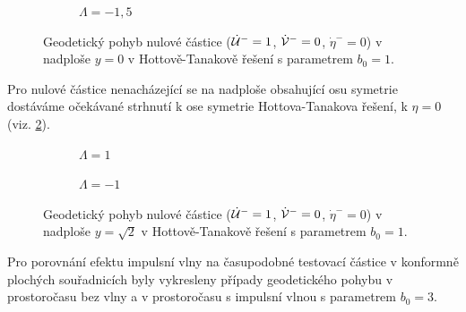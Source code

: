 \begin{figure}[ht]
\begin{subfigure}[b]{0.45\textwidth}
\begin{tikzpicture}
        \end{tikzpicture}
        \caption{$\Lambda = -1,5$}
    \end{subfigure}
    \caption{Geodetický pohyb nulové částice ($\dot \matu^-=1$, $\dot \matv^-=0$, $\dot \eta^-=0$) v nadploše $y = 0$ v Hottově-Tanakově řešení s parametrem $b_0 = 1$.}
    \label{fig:HottaTanakaNullY0}
\end{figure}

Pro nulové částice nenacházející se na nadploše obsahující osu symetrie dostáváme očekávané strhnutí k
ose symetrie Hottova-Tanakova řešení, k $\eta=0$ (viz. \ref{fig:HottaTanakaNullYsqrt2}). 

\begin{figure}[ht]
    \centering
    \begin{subfigure}[b]{0.45\textwidth}
        \caption{$\Lambda = 1$}
    \end{subfigure}
    \hfill
    \begin{subfigure}[b]{0.45\textwidth}
        \caption{$\Lambda = -1$}
    \end{subfigure}
    \caption{Geodetický pohyb nulové částice ($\dot \matu^-=1$, $\dot \matv^-=0$, $\dot \eta^-=0$) v nadploše $y = \sqrt{2}$ v Hottově-Tanakově řešení s parametrem $b_0 = 1$.}
    \label{fig:HottaTanakaNullYsqrt2}
\end{figure}

Pro porovnání efektu impulsní vlny na časupodobné testovací částice v konformně plochých souřadnicích byly vykresleny případy geodetického pohybu v prostoročasu bez vlny
a v prostoročasu s impulsní vlnou s parametrem $b_0=3$.

